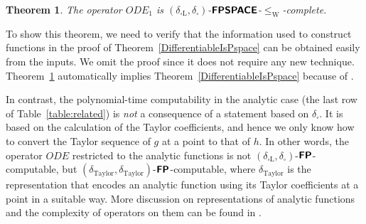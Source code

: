 \documentclass[12pt,a4paper]{article}
\newtheorem{theorem}{Theorem}%
\theoremstyle{definition}
\theoremstyle{remark}
\newcommand{\N}{\mathbf N}
\newcommand{\OpIVP}{\mathit{ODE}}
\newcommand{\deltabox}{\delta _\square}
\newcommand{\deltaboxLip}{\delta _{\square \mathrm L}}
\newcommand{\deltaTaylor}{\delta _{\mathrm{Taylor}}}
\newcommand{\classtwofont}[1]{\text{\bfseries \sffamily \upshape #1}}
\newcommand{\classFPtwo}{\classtwofont{FP}}
\newcommand{\classFPSPACEtwo}{\classtwofont{FPSPACE}}
\newcommand{\classCHtwo}{\classtwofont{CH}}
\newcommand{\redW}{\leq _{\mathrm W}}
\begin{document}
\begin{theorem}
\label{theorem: C1 constructive}
The operator $\OpIVP _1$ is $(\deltaboxLip, \deltabox)$-$\classFPSPACEtwo$-$\redW$-complete.
\end{theorem}

To show this theorem,
we need to verify that the information used to construct functions in the proof of Theorem~\ref{DifferentiableIsPspace}
can be obtained easily from the inputs.
We omit the proof since it does not require any new technique.
Theorem~\ref{theorem: C1 constructive}
automatically implies Theorem~\ref{DifferentiableIsPspace} 
because of \cite[Lemmas 3.7 and 3.8]{kawamura2010operators}. 


In contrast, 
the polynomial-time computability in the analytic case
(the last row of Table~\ref{table:related})
is \emph{not} a consequence of a statement based on $\deltabox$. 
It is based on the calculation of the Taylor coefficients, 
and hence we only know how 
to convert the Taylor sequence of $g$ at a point to that of $h$. 
In other words, 
the operator $\OpIVP$ restricted to the analytic functions
is not $(\deltaboxLip, \deltabox)$-$\classFPtwo$-computable, 
but $(\deltaTaylor, \deltaTaylor)$-$\classFPtwo$-computable, 
where $\deltaTaylor$ is the representation that 
encodes an analytic function using its Taylor coefficients at a point 
in a suitable way. 
More discussion on representations of analytic functions 
and the complexity of operators on them 
can be found in 
\cite{kawamura12:_unifor_polyt_comput_operat_univar}. 
\end{document}
